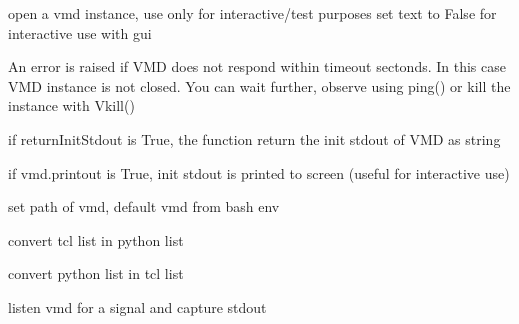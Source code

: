 \documentclass[letterpaper,10pt,english]{sphinxmanual}
\begin{document}
\begin{fulllineitems}
\label{vmdpipe:vmdpipe.Vopen}
open a vmd instance, use only for interactive/test purposes
set text to False for interactive use with gui

An error is raised if VMD does not respond within timeout sectonds. In this case VMD instance is not closed. 
You can wait further, observe using ping() or kill the instance with Vkill()

if returnInitStdout is True, the function return the init stdout of VMD as string

if vmd.printout is True, init stdout is printed to screen (useful for interactive use)

\end{fulllineitems}


\begin{fulllineitems}
\label{vmdpipe:vmdpipe.Vsetpath}
set path of vmd, default vmd from bash env

\end{fulllineitems}


\begin{fulllineitems}
\label{vmdpipe:vmdpipe.aspylist}
convert tcl list in python list

\end{fulllineitems}


\begin{fulllineitems}
\label{vmdpipe:vmdpipe.astcllist}
convert python list in tcl list

\end{fulllineitems}


\begin{fulllineitems}
\label{vmdpipe:vmdpipe.callback}
listen vmd for a signal and capture stdout

\end{fulllineitems}
\end{document}
